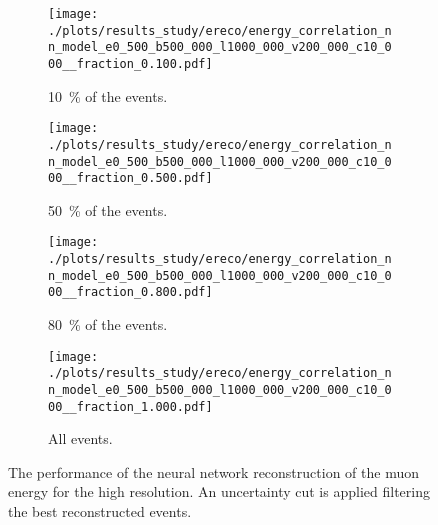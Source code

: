 \begin{figure}[H]
    \centering
    \begin{subfigure}{0.48\textwidth}
        \centering
        \texttt{[image: ./plots/results\_study/ereco/energy\_correlation\_nn\_model\_e0\_500\_b500\_000\_l1000\_000\_v200\_000\_c10\_000\_\_fraction\_0.100.pdf]}
        \caption{\SI{10}{\%} of the events.}
        \label{fig:study_ereco_nn_high_perform_0.1}
    \end{subfigure}
    \hfill
    \begin{subfigure}{0.48\textwidth}
        \centering
        \texttt{[image: ./plots/results\_study/ereco/energy\_correlation\_nn\_model\_e0\_500\_b500\_000\_l1000\_000\_v200\_000\_c10\_000\_\_fraction\_0.500.pdf]}
        \caption{\SI{50}{\%} of the events.}
        \label{fig:study_ereco_nn_high_perform_0.5}
    \end{subfigure}
    \begin{subfigure}{0.48\textwidth}
        \vspace{0.5cm}
        \centering
        \texttt{[image: ./plots/results\_study/ereco/energy\_correlation\_nn\_model\_e0\_500\_b500\_000\_l1000\_000\_v200\_000\_c10\_000\_\_fraction\_0.800.pdf]}
        \caption{\SI{80}{\%} of the events.}
        \label{fig:study_ereco_nn_high_perform_0.8}
    \end{subfigure}
    \hfill
    \begin{subfigure}{0.48\textwidth}
        \vspace{0.5cm}
        \centering
        \texttt{[image: ./plots/results\_study/ereco/energy\_correlation\_nn\_model\_e0\_500\_b500\_000\_l1000\_000\_v200\_000\_c10\_000\_\_fraction\_1.000.pdf]}
        \caption{All events.}
        \label{fig:study_ereco_nn_high_perform_1.0}
    \end{subfigure}
    \caption{The performance of the neural network reconstruction of the muon energy for the high resolution. An uncertainty cut is applied filtering the best reconstructed events.}
    \label{fig:study_ereco_nn_high_perform}
\end{figure}

